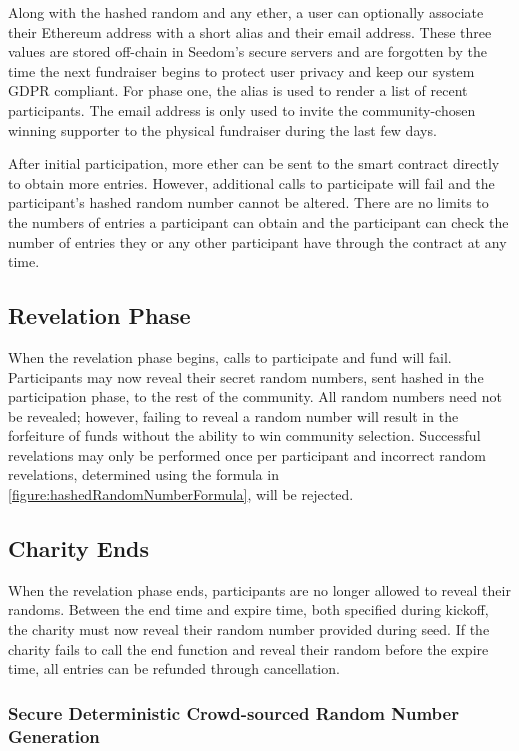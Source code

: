\documentclass[11pt]{article}
\begin{document}
Along with the hashed random and any ether, a user can optionally associate their Ethereum address with a short alias and their email address. These three values are stored off-chain in Seedom's secure servers and are forgotten by the time the next fundraiser begins to protect user privacy and keep our system GDPR compliant. For phase one, the alias is used to render a list of recent participants. The email address is only used to invite the community-chosen winning supporter to the physical fundraiser during the last few days.

After initial participation, more ether can be sent to the smart contract directly to obtain more entries. However, additional calls to participate will fail and the participant's hashed random number cannot be altered. There are no limits to the numbers of entries a participant can obtain and the participant can check the number of entries they or any other participant have through the contract at any time.

\subsection{Revelation Phase}

When the revelation phase begins, calls to participate and fund will fail. Participants may now reveal their secret random numbers, sent hashed in the participation phase, to the rest of the community. All random numbers need not be revealed; however, failing to reveal a random number will result in the forfeiture of funds without the ability to win community selection. Successful revelations may only be performed once per participant and incorrect random revelations, determined using the formula in \ref{figure:hashedRandomNumberFormula}, will be rejected.

\subsection{Charity Ends}

When the revelation phase ends, participants are no longer allowed to reveal their randoms. Between the end time and expire time, both specified during kickoff, the charity must now reveal their random number provided during seed. If the charity fails to call the end function and reveal their random before the expire time, all entries can be refunded through cancellation.

\subsubsection{Secure Deterministic Crowd-sourced Random Number Generation}
\end{document}
